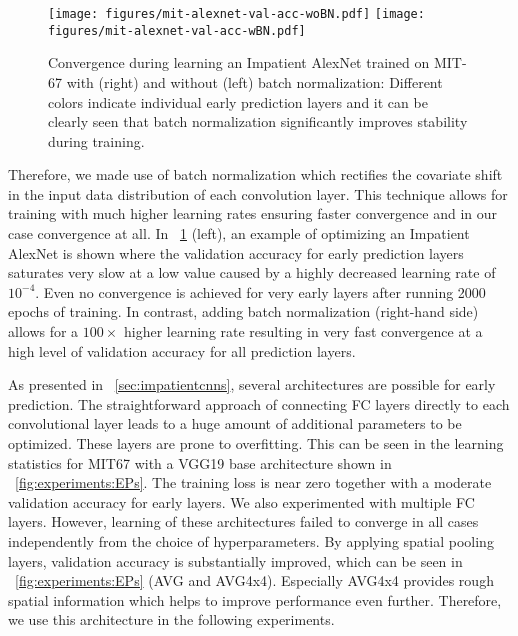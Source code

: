 \documentclass{bmvc2k}
\begin{document}
    \begin{figure}[t]
        \centering
        \texttt{[image: figures/mit-alexnet-val-acc-woBN.pdf]} \hfil %
        \texttt{[image: figures/mit-alexnet-val-acc-wBN.pdf]}  %
        \caption{Convergence during learning an Impatient AlexNet trained on MIT-67 with (right) and without (left) batch normalization:
            Different colors indicate individual early prediction layers and it can be clearly seen that batch normalization significantly improves
            stability during training.
        }
        \label{fig:experiments:batchNormPlot}
    \end{figure}

    Therefore, we made use of batch normalization \cite{ioffe2015batch} which rectifies the covariate shift in the input data distribution of each convolution layer.
    This technique allows for training with much higher learning rates ensuring faster convergence and in our case convergence at all.
    In \figurename~\ref{fig:experiments:batchNormPlot} (left), an example of optimizing an Impatient AlexNet is shown where the validation accuracy for early prediction layers saturates very slow at a low value caused by a highly decreased learning rate of $10^{-4}$.
    Even no convergence is achieved for very early layers after running 2000 epochs of training.
    In contrast, adding batch normalization (right-hand side) allows for a $100\times$ higher learning rate resulting in very fast convergence at a high level of validation accuracy for all prediction layers.
    
    
    As presented in \sectionname~\ref{sec:impatientcnns}, several architectures are possible for early prediction.
    The straightforward approach of connecting FC layers directly to each convolutional layer leads to a huge amount of additional parameters to be optimized.
    These layers are prone to overfitting.
    This can be seen in the learning statistics for MIT67 with a VGG19 base architecture shown in \figurename~\ref{fig:experiments:EPs}.
    The training loss is near zero together with a moderate validation accuracy for early layers.
    We also experimented with multiple FC layers.
    However, learning of these architectures failed to converge in all cases independently from the choice of hyperparameters.
    By applying spatial pooling layers, validation accuracy is substantially improved, 
    which can be seen in \figurename~\ref{fig:experiments:EPs} (AVG and AVG4x4).
    Especially AVG4x4 provides rough spatial information which helps to improve performance even further. Therefore, we use this architecture in the following experiments.
    
\end{document}
